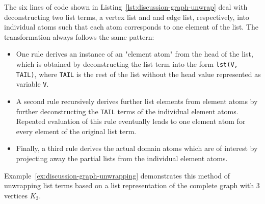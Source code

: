 The six lines of code shown in Listing~\ref{lst:discussion-graph-unwrap} deal with deconstructing two list terms, a vertex list and and edge list, respectively, into individual atoms such that each atom corresponds to one element of the list.
The transformation always follows the same pattern:
\begin{itemize}
    \item One rule derives an instance of an "element atom" from the head of the list, which is obtained by deconstructing the list term into the form \texttt{lst(V, TAIL)}, where \texttt{TAIL} is the rest of the list without the head value represented as variable \texttt{V}.
    \item A second rule recursively derives further list elements from element atoms by further deconstructing the \texttt{TAIL} terms of the individual element atoms. Repeated evaluation of this rule eventually leads to one element atom for every element of the original list term.
    \item Finally, a third rule derives the actual domain atoms which are of interest by projecting away the partial lists from the individual element atoms.
\end{itemize}    

Example~\ref{ex:discussion-graph-unwrapping} demonstrates this method of unwrapping list terms based on a list representation of the complete graph with 3 vertices $K_3$.


